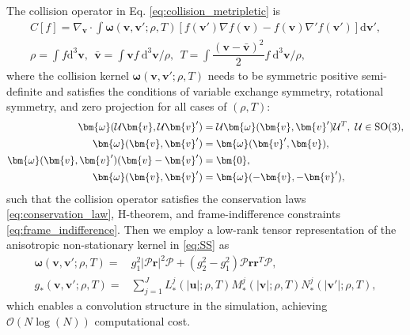 \documentclass[preprint,1p,times]{elsarticle}
\newcommand{\cO}{\mathcal{O}}
\theoremstyle{definition}
\theoremstyle{remark}
\begin{document}
The collision operator in Eq. \eqref{eq:collision_metripletic} is
\begin{equation*}
    \begin{aligned}
        C[f] = \nabla_{\bm{v}} \cdot \int \bm{\omega}(\bm{v}, \bm{v}'; \rho, T) \left[ f(\bm{v}') \nabla f(\bm{v}) - f(\bm{v}) \nabla' f(\bm{v}') \right] \mathrm{d}\bm{v}', \\
        \rho = \int f \mathrm{d}^{3} \bm{v}, ~~ \bar{\bm{v}} = \int \bm{v} f ~ \mathrm{d}^{3} \bm{v} / \rho, ~~ T = \int \dfrac{(\bm{v} - \bar{\bm{v}})^{2}}{2} f ~ \mathrm{d}^{3} \bm{v} / \rho ,
    \end{aligned}
\end{equation*}
where the collision kernel $\bm{\omega}(\bm{v}, \bm{v}'; \rho, T)$ needs to be symmetric positive semi-definite and satisfies the conditions of variable exchange symmetry, rotational symmetry, and zero projection for all cases of $(\rho, T)$:
\begin{equation}\label{eq:kernel_conditions}
    \begin{aligned}
        \bm{\omega}(\mathcal{U}\bm{v},\mathcal{U}\bm{v}') &= \mathcal{U}\bm{\omega}(\bm{v},\bm{v}')\mathcal{U}^T,~  \mathcal{U} \in {\rm SO}(3) , \\
        \bm{\omega}(\bm{v},\bm{v}') &= \bm{\omega}(\bm{v}',\bm{v}) , \\
        \bm{\omega}(\bm{v},\bm{v}')(\bm{v} -\bm{v}') &= \bm{0} , \\
        \bm{\omega}(\bm{v},\bm{v}') &= \bm{\omega}(-\bm{v},-\bm{v}') ,
    \end{aligned}
\end{equation}
such that the collision operator satisfies the conservation laws \eqref{eq:conservation_law}, H-theorem, and frame-indifference constraints \eqref{eq:frame_indifference}.
Then we employ a low-rank tensor representation of the anisotropic non-stationary kernel in \eqref{eq:SS} as 
\begin{equation}\label{eq:CM2}
\begin{aligned}
    \bm{\omega} (\bm{v}, \bm{v}'; \rho, T) =& g_{1}^{2} |\bm{\mathcal{P}}\bm{r}|^{2} \bm{\mathcal{P}} + (g_{2}^{2}-g_{1}^{2}) \bm{\mathcal{P}} \bm{r} \bm{r}^{T} \bm{\mathcal{P}} , \\
    g_{\ast}(\bm{v}, \bm{v}'; \rho, T) =& \sum_{j=1}^{J} L_{\ast}^{j}(|\bm{u}|; \rho, T) M_{\ast}^{j}(|\bm{v}|; \rho, T) N_{\ast}^{j}(|\bm{v}'|; \rho, T) ,
\end{aligned}
\end{equation}
which enables a convolution structure in the simulation, achieving $\cO(N \log(N))$ computational cost.
\end{document}

